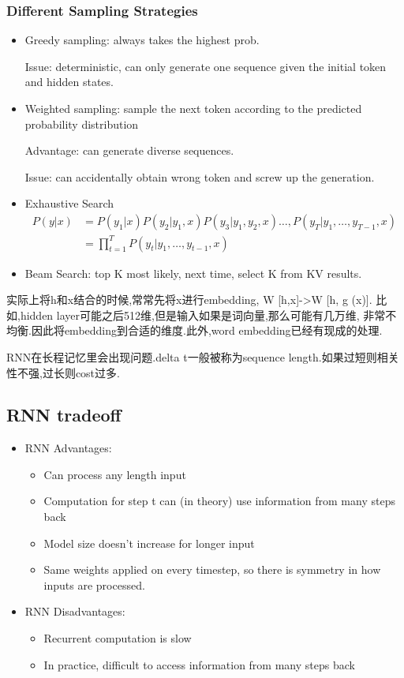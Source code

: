 	\subsubsection{Different Sampling Strategies}
	\begin{itemize}
		\item Greedy sampling: always takes the highest prob.
		
		Issue: deterministic, can only generate one sequence given
		the initial token and hidden states.
		\item Weighted sampling: sample the next token according to the
		predicted probability distribution
		
		Advantage: can generate diverse sequences.
		
		Issue: can accidentally obtain wrong token and screw up the
		generation.
		\item Exhaustive Search
		\[
		\begin{aligned}P(y|x)&=P(y_1|x)P(y_2|y_1,x)P(y_3|y_1,y_2,x)\ldots,P(y_T|y_1,\ldots,y_{T-1},x)\\&=\prod_{t=1}^TP(y_t|y_1,\ldots,y_{t-1},x)\end{aligned}
		\]
		\item Beam Search: top K most likely, next time, select K from KV results.
	\end{itemize}
	
	实际上将h和x结合的时候,常常先将x进行embedding, W [h,x]->W [h, g (x)].
	比如,hidden layer可能之后512维,但是输入如果是词向量,那么可能有几万维,
	非常不均衡.因此将embedding到合适的维度.此外,word embedding已经有现成的处理.
	
	RNN在长程记忆里会出现问题.delta t一般被称为sequence length.如果过短则相关性不强,过长则cost过多.
	
	\subsection{RNN tradeoff}
	\begin{itemize}
		\item RNN Advantages:
		\begin {itemize}
			\item Can process any length input
			\item Computation for step t can (in theory) use information from many steps back
			\item Model size doesn't increase for longer input
			\item Same weights applied on every timestep, so there is symmetry in how inputs are processed.
		\end{itemize}
		\item RNN Disadvantages:
		\begin{itemize}
			\item Recurrent computation is slow
			\item In practice, difficult to access information from many steps back
		\end{itemize}
	\end{itemize}

